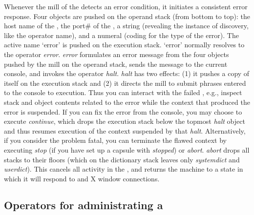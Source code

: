Whenever the mill of the  detects an error condition, it initiates a consistent error response. Four objects are pushed on the operand stack (from bottom to top): the host name of the , the port\# of the , a string (revealing the instance of discovery, like the operator name), and a numeral (coding for the type of the error). The active name `error' is pushed on the execution stack. `error' normally resolves to the operator \emph{error}. \emph{error} formulates an error message from the four objects pushed by the mill on the operand stack, sends the message to the current console, and invokes the operator \emph{halt}. \emph{halt} has two effects: (1) it pushes a copy of itself on the execution stack and (2) it directs the mill to submit phrases entered to the console to execution. Thus you can interact with the failed , e.g., inspect stack and object contents related to the error while the context that produced the error is suspended. If you can fix the error from the console, you may choose to execute \emph{continue}, which drops the execution stack below the topmost \emph{halt} object and thus resumes execution of the context suspended by that \emph{halt}. Alternatively, if you consider the problem fatal, you can terminate the flawed context by executing \emph{stop} (if you have set up a capsule with \emph{stopped}) or \emph{abort}. \emph{abort} drops all stacks to their floors (which on the dictionary stack leaves only \emph{systemdict} and \emph{userdict}). This cancels all activity in the , and returns the machine to a state in which it will respond to  and X window connections.


\subsection{Operators for administrating  a }\label{ssec:opsdnode} 

